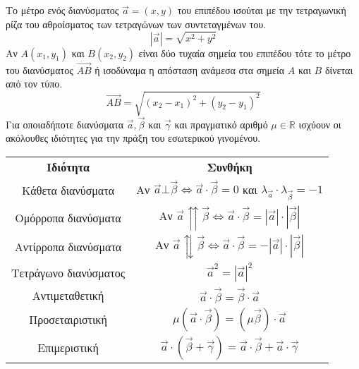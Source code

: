 \documentclass[twoside,nofonts,internet,shmeiwseis]{thewria}
\begin{document}
\mbox{}\\\\
Το μέτρο ενός διανύσματος $ \vec{a}=(x,y) $ του επιπέδου ισούται με την τετραγωνική ρίζα του αθροίσματος των τετραγώνων των συντεταγμένων του.
\[ |\vec{a}|=\sqrt{x^2+y^2} \]
Αν $ A(x_1,y_1) $ και $ B(x_2,y_2) $ είναι δύο τυχαία σημεία του επιπέδου τότε το μέτρο του διανύσματος $ \overrightarrow{AB} $ ή ισοδύναμα η απόσταση ανάμεσα στα σημεία $ A $ και $ B $ δίνεται από τον τύπο.
\[ \overrightarrow{AB}=\sqrt{(x_2-x_1)^2+(y_2-y_1)^2} \]
Για οποιαδήποτε διανύσματα $ \vec{a},\vec{\beta} $ και $ \vec{\gamma} $ και πραγματικό αριθμό $ \mu\in\mathbb{R} $ ισχύουν οι ακόλουθες ιδιότητες για την πράξη του εσωτερικού γινομένου.
\begin{center}
\begin{longtable}{cc}
\hline \rule[-2ex]{0pt}{5.5ex} \textbf{Ιδιότητα} & \textbf{Συνθήκη} \\ 
\hhline{==}  \rule[-2ex]{0pt}{5.5ex} Κάθετα διανύσματα & Αν $ \vec{a}\bot\vec{\beta}\Leftrightarrow \vec{a}\cdot\vec{\beta}=0 $ και $ \lambda_{\vec{a}}\cdot\lambda_{\vec{\beta}}=-1 $ \\ 
 \rule[-2ex]{0pt}{5.5ex} Ομόρροπα διανύσματα & Αν $ \vec{a}\upuparrows\vec{\beta}\Leftrightarrow \vec{a}\cdot\vec{\beta}=|\vec{a}|\cdot|\vec{\beta}| $ \\ 
 \rule[-2ex]{0pt}{5.5ex} Αντίρροπα διανύσματα & Αν $ \vec{a}\updownarrows\vec{\beta}\Leftrightarrow \vec{a}\cdot\vec{\beta}=-|\vec{a}|\cdot|\vec{\beta}| $ \\ 
 \rule[-2ex]{0pt}{5.5ex} Τετράγωνο διανύσματος & $ \vec{a}^2=|\vec{a}|^2 $ \\ 
\rule[-2ex]{0pt}{5.5ex} Αντιμεταθετική & $ \vec{a}\cdot\vec{\beta}=\vec{\beta}\cdot\vec{a} $ \\
 \rule[-2ex]{0pt}{5.5ex} Προσεταιριστική & $ \mu(\vec{a}\cdot\vec{\beta})=(\mu\vec{\beta})\cdot\vec{a} $ \\
\rule[-2ex]{0pt}{5.5ex} Επιμεριστική & $ \vec{a}\cdot\left( \vec{\beta}+\vec{\gamma}\right) =\vec{a}\cdot\vec{\beta}+\vec{a}\cdot\vec{\gamma} $ \\
\hline 
\end{longtable} 
\end{center}
\end{document}
